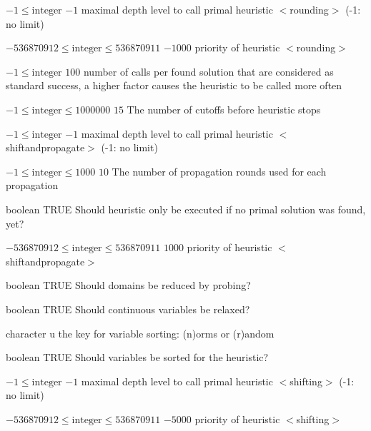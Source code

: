 %
{$-1\leq\textrm{integer}$}%
{$-1$}%
{maximal depth level to call primal heuristic $<$rounding$>$ (-1: no limit)}%
{}

%
{$-536870912\leq\textrm{integer}\leq536870911$}%
{$-1000$}%
{priority of heuristic $<$rounding$>$}%
{}

%
{$-1\leq\textrm{integer}$}%
{$100$}%
{number of calls per found solution that are considered as standard success, a higher factor causes the heuristic to be called more often}%
{}

%
{$-1\leq\textrm{integer}\leq1000000$}%
{$15$}%
{The number of cutoffs before heuristic stops}%
{}

%
{$-1\leq\textrm{integer}$}%
{$-1$}%
{maximal depth level to call primal heuristic $<$shiftandpropagate$>$ (-1: no limit)}%
{}

%
{$-1\leq\textrm{integer}\leq1000$}%
{$10$}%
{The number of propagation rounds used for each propagation}%
{}

%
{boolean}%
{TRUE}%
{Should heuristic only be executed if no primal solution was found, yet?}%
{}

%
{$-536870912\leq\textrm{integer}\leq536870911$}%
{$1000$}%
{priority of heuristic $<$shiftandpropagate$>$}%
{}

%
{boolean}%
{TRUE}%
{Should domains be reduced by probing?}%
{}

%
{boolean}%
{TRUE}%
{Should continuous variables be relaxed?}%
{}

%
{character}%
{u}%
{the key for variable sorting: (n)orms or (r)andom}%
{}

%
{boolean}%
{TRUE}%
{Should variables be sorted for the heuristic?}%
{}

%
{$-1\leq\textrm{integer}$}%
{$-1$}%
{maximal depth level to call primal heuristic $<$shifting$>$ (-1: no limit)}%
{}

%
{$-536870912\leq\textrm{integer}\leq536870911$}%
{$-5000$}%
{priority of heuristic $<$shifting$>$}%
{}

